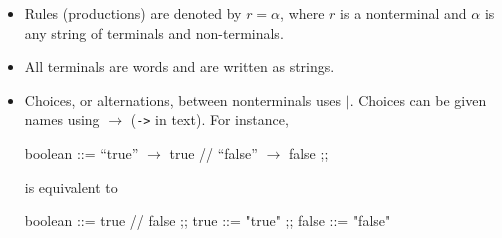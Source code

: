 
\begin{itemize}
  \item Rules (productions) are denoted by $r = \alpha$, where $r$ is a nonterminal and $\alpha$ is any string of terminals and non-terminals.
  \item All terminals are words and are written as strings.
  \item Choices, or alternations, between nonterminals uses $|.$ Choices can be given names using $\to$ (\texttt{->} in text). For instance,

  \begin{bnf}
  boolean ::= ``true'' $\to$ true // ``false'' $\to$ false ;;
\end{bnf}

  is equivalent to

\begin{bnf}
  boolean ::= true // false ;; true ::= "true" ;; false ::= "false"
\end{bnf}


\end{itemize}

